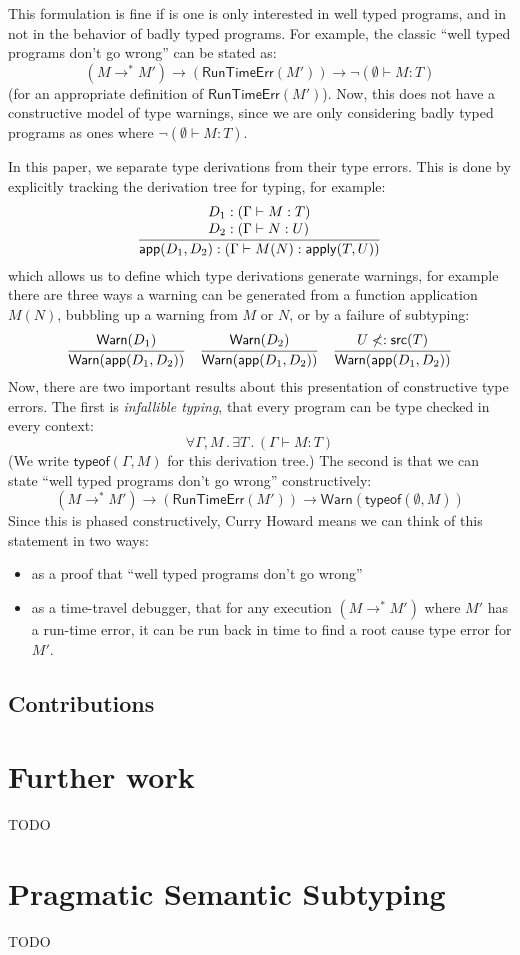 \documentclass[acmsmall,review,screen]{acmart}
\makeatletter
\newcommand{\infer}[2]{\frac{\displaystyle\begin{array}{@{}l@{}}#1\end{array}}{\displaystyle#2}}
\newcommand{\WARN}{\mathsf{Warn}}
\newcommand{\RUNTIMEERR}{\mathsf{RunTimeErr}}
\newcommand{\APPLY}{\mathsf{apply}}
\newcommand{\APP}{\mathsf{app}}
\newcommand{\SRC}{\mathsf{src}}
\newcommand{\TYPEOF}{\mathsf{typeof}}
\newcommand{\fun}{\mathbin{\rightarrow}}
\newcommand{\st}{\mathbin.}
\makeatother
\begin{document}
This formulation is fine if is one is only interested in well typed programs,
and in not in the behavior of badly typed programs. For example,
the classic ``well typed programs don't go wrong'' can be stated as:
\[
  (M \rightarrow^* M') \fun
  (\RUNTIMEERR(M')) \fun
  \neg(\emptyset \vdash M : T)
\]
(for an appropriate definition of $\RUNTIMEERR(M')$). Now, this does not have
a constructive model of type warnings, since we are only considering
badly typed programs as ones where $\neg(\emptyset \vdash M : T)$.

In this paper, we separate type derivations from their type errors.
This is done by explicitly tracking the derivation tree for typing,
for example:
\[
  \infer{
    D_1 : (\Gamma \vdash M : T) \\
    D_2 : (\Gamma \vdash N : U)
  }{
    \APP(D_1, D_2) : (\Gamma \vdash M(N) : \APPLY(T,U))
  }
\]
which allows us to define which type derivations generate warnings,
for example there are three ways a warning can be generated from a
function application $M(N)$, bubbling up a warning from $M$ or $N$, or
by a failure of subtyping:
\[
  \infer{
    \WARN(D_1)
  }{
    \WARN(\APP(D_1, D_2))
  }
\quad
  \infer{
    \WARN(D_2)
  }{
    \WARN(\APP(D_1, D_2))
  }
\quad
  \infer{
    U \not<: \SRC(T)
  }{
    \WARN(\APP(D_1, D_2))
  }
\]
Now, there are two important results about this presentation of
constructive type errors. The first is \emph{infallible typing},
that every program can be type checked in every context:
\[
  \forall \Gamma, M \st
  \exists T \st
  (\Gamma \vdash M : T)
\]
(We write $\TYPEOF(\Gamma, M)$ for this derivation tree.)
The second is that we can state ``well typed programs don't go wrong''
constructively:
\[
  (M \rightarrow^* M') \fun
  (\RUNTIMEERR(M')) \fun
  \WARN(\TYPEOF(\emptyset, M))
\]
Since this is phased constructively,
Curry Howard means we can think of this statement in two ways:
\begin{itemize}
  \item as a proof that ``well typed programs don't go wrong''
  \item as a time-travel debugger,
    that for any execution $(M \rightarrow^* M')$
    where $M'$ has a run-time error,
    it can be run back in time to find a root cause type error for $M'$.
\end{itemize}
  
\subsection{Contributions}

\section{Further work}

TODO

\appendix

\section{Pragmatic Semantic Subtyping}
\label{app:semsub}

TODO



\end{document}
